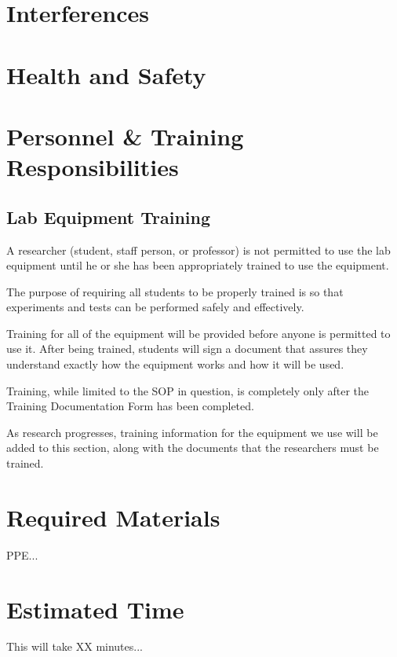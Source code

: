 \documentclass[12pt]{../SOP3_beta}
\begin{document}
\section{Interferences}

\section{Health and Safety}

\NP 

\section{Personnel \& Training Responsibilities}

\subsection*{Lab Equipment Training}

\NP A researcher (student, staff person, or professor) is not permitted to use the lab equipment until he or she has been appropriately trained to use the equipment.

\NP The purpose of requiring all students to be properly trained is so that experiments and tests can be performed safely and effectively.  

\NP Training for all of the equipment will be provided before anyone is permitted to use it.  After being trained, students will sign a document that assures they understand exactly how the equipment works and how it will be used.

\NP Training, while limited to the SOP in question, is completely only after the Training Documentation Form has been completed.

\NP As research progresses, training information for the equipment we use will be added to this section, along with the documents that the researchers must be trained.

\section{Required Materials}

\NP PPE...



\section{Estimated Time}

\NP This will take XX minutes...
\end{document}
